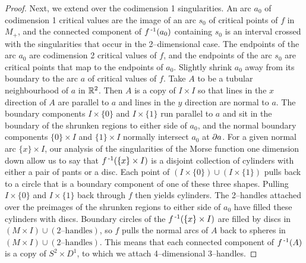 \begin{proof}
Next, we extend over the codimension 1 singularities.
An arc $a_0$ of codimension 1 critical values are the image of an arc $s_0$ of critical points of $f$ in $M_+$, and the connected component of $f^{\,\text{-}1} (a_0)$ containing $s_0$ is an interval crossed with the singularities that occur in the 2--dimensional case.
The endpoints of the arc $a_0$ are codimension 2 critical values of $f$, and the endpoints of the arc $s_0$ are critical points that map to the endpoints of $a_0$.
Slightly shrink $a_0$ away from its boundary to the arc $a$ of critical values of $f$.
Take $A$ to be a tubular neighbourhood of $a$ in $\mathbb{R}^2$.
Then $A$ is a copy of $I\times I$ so that lines in the $x$ direction of $A$ are parallel to $a$ and lines in the $y$ direction are normal to $a$.
The boundary components $I\times \{0\}$ and $I\times \{1\}$ run parallel to $a$ and sit in the boundary of the shrunken regions to either side of $a_0$, and the normal boundary components $\{0\}\times I$ and $\{1\}\times I$ normally intersect $a_0$ at $\partial a$.
For a given normal arc $\{x\}\times I$, our analysis of the singularities of the Morse function one dimension down allow us to say that $f^{\,\text{-}1}(\{x\}\times I)$ is a disjoint collection of cylinders with either a pair of pants or a disc.
Each point of $(I\times \{0\})\cup (I\times\{1\})$ pulls back to a circle that is a boundary component of one of these three shapes.
Pulling $I\times \{0\}$ and $I\times\{1\}$ back through $f$ then yields cylinders.
The 2--handles attached over the preimages of the shrunken regions to either side of $a_0$ have filled these cylinders with discs.
Boundary circles of the $f^{\,\text{-}1} (\{x\}\times I)$ are filled by discs in $(M\times I)\cup (2\text{--handles})$, so $f$ pulls the normal arcs of $A$ back to spheres in $(M\times I)\cup (2\text{--handles})$.
This means that each connected component of $f^{\,\text{-}1} (A)$ is a copy of $S^2\times D^1$, to which we attach 4--dimensional 3--handles.


\end{proof}
